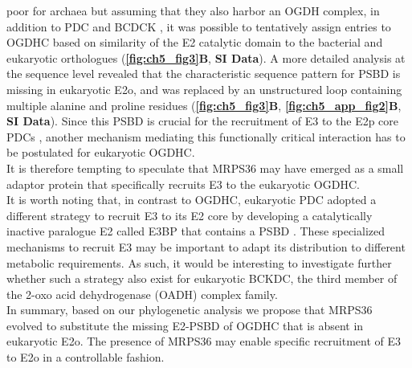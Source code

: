 poor for archaea but assuming that they also harbor an OGDH complex, in addition to PDC and BCDCK \cite{Heath_2007}, it was possible to tentatively assign entries to OGDHC based on similarity of the E2 catalytic domain to the bacterial and eukaryotic orthologues (\textbf{\autoref{fig:ch5_fig3}B}, \textbf{SI Data}). A more detailed analysis at the sequence level revealed that the characteristic sequence pattern for PSBD is missing in eukaryotic E2o, and was replaced by an unstructured loop containing multiple alanine and proline residues (\textbf{\autoref{fig:ch5_fig3}B}, \textbf{\autoref{fig:ch5_app_fig2}B}, \textbf{SI Data}). Since this PSBD is crucial for the recruitment of E3 to the E2p core PDCs \cite{Allen_2005, Chandrasekhar_2013, Ciszak_2006, Mande_1996}, another mechanism mediating this functionally critical interaction has to be postulated for eukaryotic OGDHC.\\
It is therefore tempting to speculate that MRPS36 may have emerged as a small adaptor protein that specifically recruits E3 to the eukaryotic OGDHC.\\
It is worth noting that, in contrast to OGDHC, eukaryotic PDC adopted a different strategy to recruit E3 to its E2 core by developing a catalytically inactive paralogue E2 called E3BP that contains a PSBD \cite{Behal_1994, Smolle_2006}. These specialized mechanisms to recruit E3 may be important to adapt its distribution to different metabolic requirements. As such, it would be interesting to investigate further whether such a strategy also exist for eukaryotic BCKDC, the third member of the 2-oxo acid dehydrogenase (OADH) complex family.\\
In summary, based on our phylogenetic analysis we propose that MRPS36 evolved to substitute the missing E2-PSBD of OGDHC that is absent in eukaryotic E2o. The presence of MRPS36 may enable specific recruitment of E3 to E2o in a controllable fashion.

